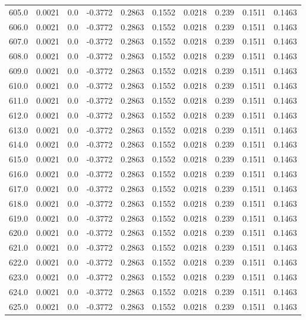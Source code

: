 \begin{longtable}{lrrrrrrrrr}
605.0 & 0.0021 & 0.0 & -0.3772 & 0.2863 & 0.1552 & 0.0218 & 0.239 & 0.1511 & 0.1463 \\
606.0 & 0.0021 & 0.0 & -0.3772 & 0.2863 & 0.1552 & 0.0218 & 0.239 & 0.1511 & 0.1463 \\
607.0 & 0.0021 & 0.0 & -0.3772 & 0.2863 & 0.1552 & 0.0218 & 0.239 & 0.1511 & 0.1463 \\
608.0 & 0.0021 & 0.0 & -0.3772 & 0.2863 & 0.1552 & 0.0218 & 0.239 & 0.1511 & 0.1463 \\
609.0 & 0.0021 & 0.0 & -0.3772 & 0.2863 & 0.1552 & 0.0218 & 0.239 & 0.1511 & 0.1463 \\
610.0 & 0.0021 & 0.0 & -0.3772 & 0.2863 & 0.1552 & 0.0218 & 0.239 & 0.1511 & 0.1463 \\
611.0 & 0.0021 & 0.0 & -0.3772 & 0.2863 & 0.1552 & 0.0218 & 0.239 & 0.1511 & 0.1463 \\
612.0 & 0.0021 & 0.0 & -0.3772 & 0.2863 & 0.1552 & 0.0218 & 0.239 & 0.1511 & 0.1463 \\
613.0 & 0.0021 & 0.0 & -0.3772 & 0.2863 & 0.1552 & 0.0218 & 0.239 & 0.1511 & 0.1463 \\
614.0 & 0.0021 & 0.0 & -0.3772 & 0.2863 & 0.1552 & 0.0218 & 0.239 & 0.1511 & 0.1463 \\
615.0 & 0.0021 & 0.0 & -0.3772 & 0.2863 & 0.1552 & 0.0218 & 0.239 & 0.1511 & 0.1463 \\
616.0 & 0.0021 & 0.0 & -0.3772 & 0.2863 & 0.1552 & 0.0218 & 0.239 & 0.1511 & 0.1463 \\
617.0 & 0.0021 & 0.0 & -0.3772 & 0.2863 & 0.1552 & 0.0218 & 0.239 & 0.1511 & 0.1463 \\
618.0 & 0.0021 & 0.0 & -0.3772 & 0.2863 & 0.1552 & 0.0218 & 0.239 & 0.1511 & 0.1463 \\
619.0 & 0.0021 & 0.0 & -0.3772 & 0.2863 & 0.1552 & 0.0218 & 0.239 & 0.1511 & 0.1463 \\
620.0 & 0.0021 & 0.0 & -0.3772 & 0.2863 & 0.1552 & 0.0218 & 0.239 & 0.1511 & 0.1463 \\
621.0 & 0.0021 & 0.0 & -0.3772 & 0.2863 & 0.1552 & 0.0218 & 0.239 & 0.1511 & 0.1463 \\
622.0 & 0.0021 & 0.0 & -0.3772 & 0.2863 & 0.1552 & 0.0218 & 0.239 & 0.1511 & 0.1463 \\
623.0 & 0.0021 & 0.0 & -0.3772 & 0.2863 & 0.1552 & 0.0218 & 0.239 & 0.1511 & 0.1463 \\
624.0 & 0.0021 & 0.0 & -0.3772 & 0.2863 & 0.1552 & 0.0218 & 0.239 & 0.1511 & 0.1463 \\
625.0 & 0.0021 & 0.0 & -0.3772 & 0.2863 & 0.1552 & 0.0218 & 0.239 & 0.1511 & 0.1463 \\

\end{longtable}
